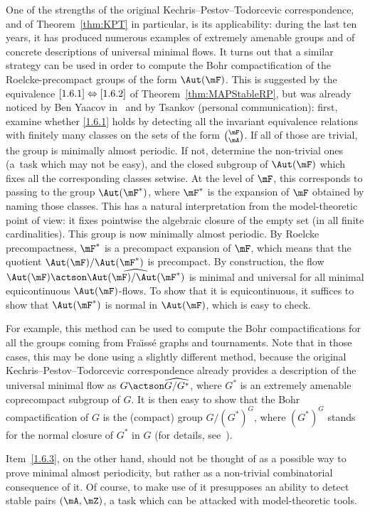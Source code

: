 One of the strengths of the original Kechris--Pestov--Todorcevic correspondence, and of Theorem~\ref{thm:KPT} in particular, is its applicability: during the last ten years, it has produced numerous examples of extremely amenable groups and of concrete descriptions of universal minimal flows. It turns out that a similar strategy can be used in order to compute the Bohr compactification of the Roelcke-precompact groups of the form $\Aut(\mF)$. This is suggested by the equivalence $\eqref{1.6.1}\Leftrightarrow \eqref{1.6.2}$ of Theorem~\ref{thm:MAPStableRP}, but was already noticed by Ben Yaacov in~\cite{BY} and by Tsankov (personal communication): first, examine whether \eqref{1.6.1} holds by detecting all the invariant equivalence relations with finitely many classes on the sets of the form $\binom{\mF}{\mA}$. If all of those are trivial, the group is minimally almost periodic. If not, determine the non-trivial ones (a~task which may not be easy), and the closed subgroup of $\Aut(\mF)$ which fixes all the corresponding classes setwise. At the level of $\mF$, this corresponds to passing to the group $\Aut(\mF^{*})$, where $\mF^{*}$ is the expansion of $\mF$ obtained by naming those classes. This has a natural interpretation from the model-theoretic point of view: it fixes pointwise the algebraic closure of the empty set (in all finite cardinalities). This group is now minimally almost periodic. By Roelcke precompactness, $\mF^{*}$ is a precompact expansion of $\mF$, which means that the quotient $\Aut(\mF)/\Aut(\mF^{*})$ is precompact. By construction, the flow $\Aut(\mF) \actson \widehat{\Aut(\mF)/\Aut(\mF^{*})}$ is minimal and universal for all minimal equicontinuous $\Aut(\mF)$-flows. To show that it is equicontinuous, it suffices to show that $\Aut(\mF^{*})$ is normal in $\Aut(\mF)$, which is easy to check.

For example, this method can be used to compute the Bohr compactifications for all the groups coming from Fra\"{\i}ss\'e graphs and tournaments. Note that in those cases, this may be done using a slightly different method, because the original Kechris--Pestov--Todorcevic correspondence already provides a description of the universal minimal flow as $G\actson \widehat{G/G^{*}}$, where $G^{*}$ is an extremely amenable coprecompact subgroup of $G$. It is then easy to show that the Bohr compactification of $G$ is the (compact) group $G/(G^{*})^{G}$, where $(G^{*})^{G}$ stands for the normal closure of $G^{*}$ in $G$ (for details, see~\cite{NVT8}).

Item~\eqref{1.6.3}, on the other hand, should not be thought of as a possible way to prove minimal almost periodicity, but rather as a non-trivial combinatorial consequence of it. Of course, to make use of it presupposes an ability to detect stable pairs $(\mA, \mZ)$, a task which can be attacked with model-theoretic tools.

